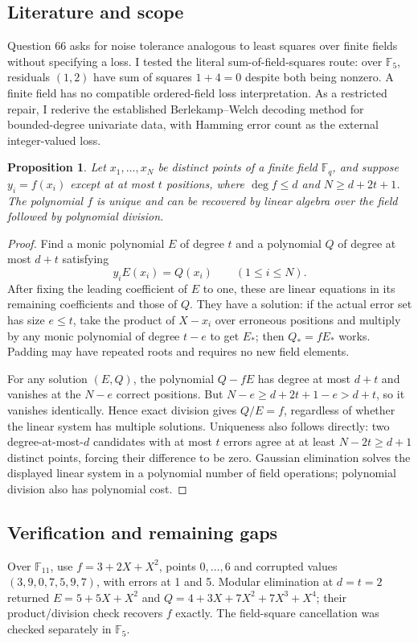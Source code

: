 \documentclass[11pt]{article}
\newtheorem{proposition}{Proposition}
\begin{document}
\subsection{Literature and scope}
Question 66 asks for noise tolerance analogous to least squares over finite fields without specifying a loss. I tested the literal sum-of-field-squares route: over $\mathbb F_5$, residuals $(1,2)$ have sum of squares $1+4=0$ despite both being nonzero. A finite field has no compatible ordered-field loss interpretation. As a restricted repair, I rederive the established Berlekamp--Welch decoding method for bounded-degree univariate data, with Hamming error count as the external integer-valued loss.
\begin{proposition}
Let $x_1,\ldots,x_N$ be distinct points of a finite field $\mathbb F_q$, and suppose $y_i=f(x_i)$ except at at most $t$ positions, where $\deg f\le d$ and $N\ge d+2t+1$. The polynomial $f$ is unique and can be recovered by linear algebra over the field followed by polynomial division.
\end{proposition}
\begin{proof}
Find a monic polynomial $E$ of degree $t$ and a polynomial $Q$ of degree at most $d+t$ satisfying
\[
y_iE(x_i)=Q(x_i)\qquad(1\le i\le N).
\]
After fixing the leading coefficient of $E$ to one, these are linear equations in its remaining coefficients and those of $Q$. They have a solution: if the actual error set has size $e\le t$, take the product of $X-x_i$ over erroneous positions and multiply by any monic polynomial of degree $t-e$ to get $E_*$; then $Q_*=fE_*$ works. Padding may have repeated roots and requires no new field elements.

For any solution $(E,Q)$, the polynomial $Q-fE$ has degree at most $d+t$ and vanishes at the $N-e$ correct positions. But $N-e\ge d+2t+1-e>d+t$, so it vanishes identically. Hence exact division gives $Q/E=f$, regardless of whether the linear system has multiple solutions. Uniqueness also follows directly: two degree-at-most-$d$ candidates with at most $t$ errors agree at at least $N-2t\ge d+1$ distinct points, forcing their difference to be zero. Gaussian elimination solves the displayed linear system in a polynomial number of field operations; polynomial division also has polynomial cost.
\end{proof}
\subsection{Verification and remaining gaps}
Over $\mathbb F_{11}$, use $f=3+2X+X^2$, points $0,\ldots,6$ and corrupted values $(3,9,0,7,5,9,7)$, with errors at 1 and 5. Modular elimination at $d=t=2$ returned $E=5+5X+X^2$ and $Q=4+3X+7X^2+7X^3+X^4$; their product/division check recovers $f$ exactly. The field-square cancellation was checked separately in $\mathbb F_5$.
\end{document}
